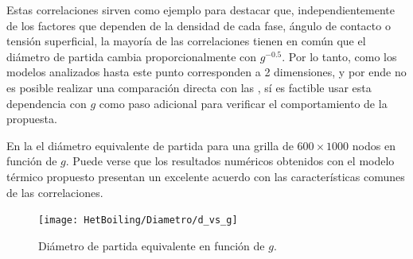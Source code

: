 
Estas correlaciones sirven como ejemplo para destacar que, independientemente de los factores que dependen de la densidad de cada fase, \'angulo de contacto o tensi\'on superficial, la mayor\'ia de las correlaciones tienen en com\'un que el di\'ametro de partida cambia proporcionalmente con $g^{-0.5}$. Por lo tanto, como los modelos analizados hasta este punto corresponden a 2 dimensiones, y por ende no es posible realizar una comparaci\'on directa con las , s\'i es factible usar esta dependencia con $g$ como paso adicional para verificar el comportamiento de la \lbe{} propuesta.

En la  el di\'ametro equivalente de partida para una grilla de $600\times 1000$ nodos en funci\'on de $g$. Puede verse que los resultados num\'ericos obtenidos con el modelo t\'ermico propuesto presentan un excelente acuerdo con las caracter\'isticas comunes de las correlaciones.

\begin{figure}[ht]
	\centering
	\texttt{[image: HetBoiling/Diametro/d\_vs\_g]}
	\caption{Di\'ametro de partida equivalente en funci\'on de $g$.}
	\label{fig:dvsg_2d}
\end{figure}







